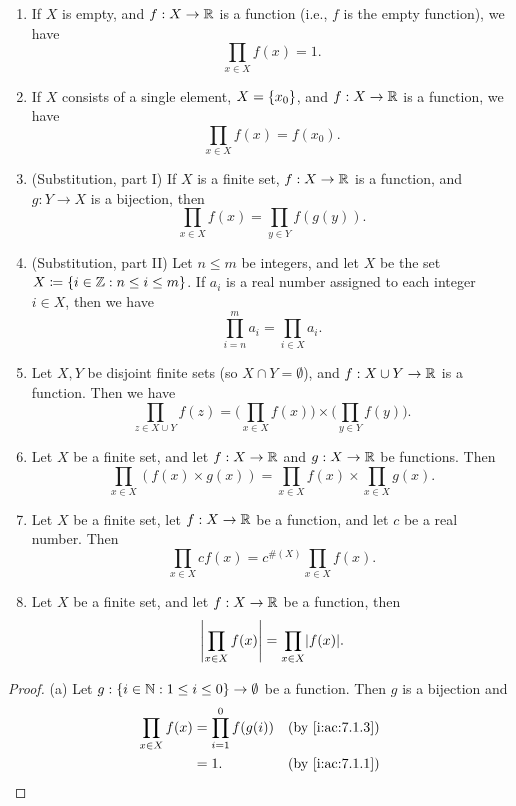 \begin{ac}\label{i:ac:7.1.5}
  \begin{enumerate}
    \item If \(X\) is empty, and \(f : X \to \mathbb{R}\) is a function (i.e., \(f\) is the empty function), we have
          \[
            \prod_{x \in X} f(x) = 1.
          \]
    \item If \(X\) consists of a single element, \(X = \left\lbrace x_0\right\rbrace\), and \(f : X \to \mathbb{R}\) is a function, we have
          \[
            \prod_{x \in X} f(x) = f(x_0).
          \]
    \item (Substitution, part I) If \(X\) is a finite set, \(f : X \to \mathbb{R}\) is a function, and \(g : Y \to X\) is a bijection, then
          \[
            \prod_{x \in X} f(x) = \prod_{y \in Y} f(g(y)).
          \]
    \item (Substitution, part II) Let \(n \leq m\) be integers, and let \(X\) be the set \(X \coloneqq \left\lbrace i \in \mathbb{Z} : n \leq i \leq m\right\rbrace\).
          If \(a_i\) is a real number assigned to each integer \(i \in X\), then we have
          \[
            \prod_{i = n}^m a_i = \prod_{i \in X} a_i.
          \]
    \item Let \(X, Y\) be disjoint finite sets (so \(X \cap Y = \emptyset\)), and \(f : X \cup Y \to \mathbb{R}\) is a function.
          Then we have
          \[
            \prod_{z \in X \cup Y} f(z) = \Bigg(\prod_{x \in X} f(x)\Bigg) \times \Bigg(\prod_{y \in Y} f(y)\Bigg).
          \]
    \item Let \(X\) be a finite set, and let \(f : X \to \mathbb{R}\) and \(g : X \to \mathbb{R}\) be functions.
          Then
          \[
            \prod_{x \in X} (f(x) \times g(x)) = \prod_{x \in X} f(x) \times \prod_{x \in X} g(x).
          \]
    \item Let \(X\) be a finite set, let \(f : X \to \mathbb{R}\) be a function, and let \(c\) be a real number.
          Then
          \[
            \prod_{x \in X} cf(x) = c^{\#(X)} \prod_{x \in X} f(x).
          \]
    \item Let \(X\) be a finite set, and let \(f : X \to \mathbb{R}\) be a function, then
          \[
            \abs{\prod_{x \in X} f(x)} = \prod_{x \in X} \abs{f(x)}.
          \]
  \end{enumerate}
\end{ac}

\begin{proof}{(a)}
  Let \(g : \left\lbrace i \in \mathbb{N} : 1 \leq i \leq 0\right\rbrace \to \emptyset\) be a function.
  Then \(g\) is a bijection and
  \begin{align*}
    \prod_{x \in X} f(x) & = \prod_{i = 1}^0 f(g(i)) &  & \by{i:ac:7.1.3} \\
                         & = 1.                      &  & \by{i:ac:7.1.1}
  \end{align*}
\end{proof}

